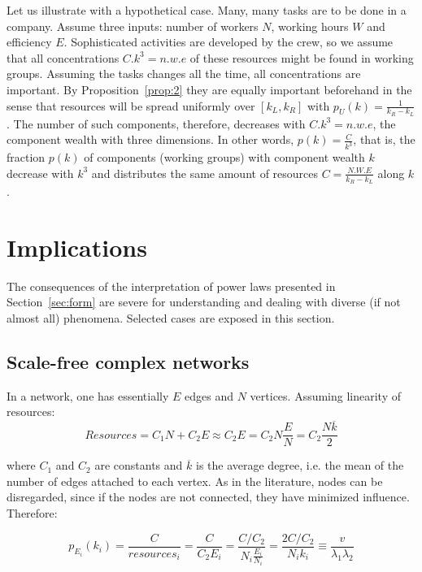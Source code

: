 \documentclass[a4paper, 11pt]{article} %
\begin{document}
Let us illustrate with a hypothetical case.
Many, many tasks are to be done in a company.
Assume three inputs:
number of workers $N$, working hours $W$
and efficiency $E$.
Sophisticated activities are developed by the crew,
so we assume that all concentrations $C.k^3=n.w.e$
of these resources might be found in working groups.
Assuming the tasks changes all the time,
all concentrations are important.
By Proposition~\ref{prop:2} they are equally important beforehand
in the sense that 
resources will be spread uniformly over $[k_L,k_R]$
with $p_U(k)=\frac{1}{k_R-k_L}$.
The number of such components, therefore,
decreases with $C.k^3=n.w.e$, the component wealth with three dimensions.
In other words,
$p(k)=\frac{C}{k^3}$, that is,
the fraction $p(k)$ of components (working groups) with component wealth $k$
decrease with $k^3$ and distributes the same
amount of resources $C=\frac{N.W.E}{k_R-k_L}$ along $k$.

\section{Implications}\label{sec:esp}
The consequences of the
interpretation of power laws presented in Section~\ref{sec:form}
are severe for understanding and dealing with
diverse (if not almost all)
phenomena. Selected cases are exposed in this section.


\subsection{Scale-free complex networks}

In a network, one has essentially $E$ edges and $N$ vertices.
Assuming linearity of resources:
\begin{equation}\label{eq:nre}
	Resources=C_1 N + C_2 E \approx C_2 E = C_2 N \frac{E}{N} = C_2 \frac{N \overline{k}}{2}
\end{equation}

\noindent where $C_1$ and $C_2$ are constants and $\overline{k}$ is
the average degree, i.e. the mean of the number of edges attached to each vertex.
As in the literature, nodes can be disregarded, since if the nodes
are not connected, they have minimized influence.
Therefore:

\begin{equation}\label{eq:eqf}
	p_{E_i}(k_i)=\frac{C}{resources_i}=\frac{C}{C_2 E_i}=\frac{C/C_2}{N_i \frac{E_i}{N_i}}=\frac{2C/C_2}{N_i k_i} \equiv \frac{v}{\lambda_1   \lambda_2}
\end{equation}
\end{document}
